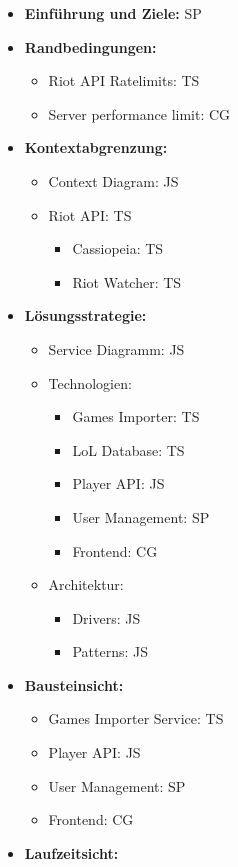\begin{itemize}
\item
\textbf{Einführung und Ziele:} SP
\item
\textbf{Randbedingungen:}
	\begin{itemize}
	\item
	Riot API Ratelimits: TS
	\item
	Server performance limit: CG
	\end{itemize}
\item
\textbf{Kontextabgrenzung:}
	\begin{itemize}
	\item
	Context Diagram: JS
	\item
	Riot API: TS
	\begin{itemize}
		\item
		Cassiopeia: TS
		\item
		Riot Watcher: TS
	\end{itemize}
	\end{itemize}
\item
\textbf{Lösungsstrategie:}
\begin{itemize}
	\item
	Service Diagramm: JS
	\item
	Technologien:
	\begin{itemize}
		\item
		Games Importer: TS
		\item
		LoL Database: TS
		\item
		Player API: JS
		\item
		User Management: SP
		\item
		Frontend: CG
	\end{itemize}
	\item
	Architektur:
	\begin{itemize}
		\item
		Drivers: JS
		\item
		Patterns: JS
	\end{itemize}
\end{itemize}
\item
\textbf{Bausteinsicht:}
\begin{itemize}
	\item
	Games Importer Service: TS
	\item
	Player API: JS
	\item
	User Management: SP
	\item 
	Frontend: CG
\end{itemize}
\item
\textbf{Laufzeitsicht:}

\end{itemize}
